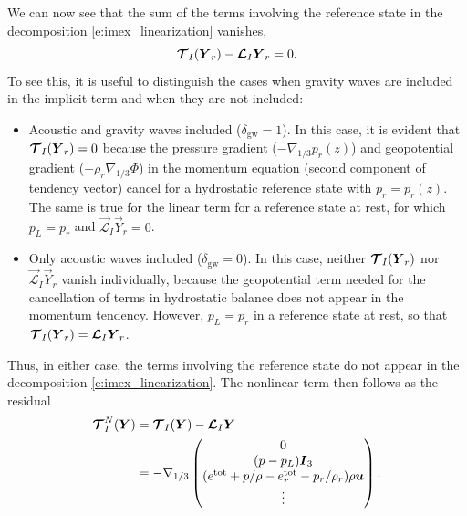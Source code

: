 \documentclass{report}
\begin{document}
{We can now see that the sum of the terms involving the reference state in the decomposition \eqref{e:imex_linearization} vanishes,
\[
\boldsymbol{{\mathcal{T}}}_I(\boldsymbol{{Y}}_r) - \boldsymbol{{\mathcal{L}}}_I \boldsymbol{{Y}}_r = 0.
\]
To see this, it is useful to distinguish the cases when gravity waves are included in the implicit term and when they are not included: 
\begin{itemize}
    \item Acoustic and gravity waves included ($\delta_{\mathrm{gw}}=1$). In this case, it is evident that $\boldsymbol{{\mathcal{T}}}_I(\boldsymbol{{Y}}_r)=0$ because the pressure gradient ($-\nabla_{1/3} p_r(z)$) and geopotential gradient ($-\rho_r\nabla_{1/3}\Phi$) in the momentum equation (second component of tendency vector) cancel for a hydrostatic reference state with $p_r = p_r(z)$. The same is true for the linear term for a reference state at rest, for which $p_L = p_r$ and $\vec{\mathcal{L}}_I \vec{Y}_r = 0$. 
    \item Only acoustic waves included ($\delta_{\mathrm{gw}}=0$). In this case, neither $\boldsymbol{{\mathcal{T}}}_I(\boldsymbol{{Y}}_r)$ nor $\vec{\mathcal{L}}_I\vec{Y}_r$ vanish individually, because the geopotential term needed for the cancellation of terms in hydrostatic balance does not appear in the momentum tendency. However, $p_L = p_r$ in a reference state at rest, so that $\boldsymbol{{\mathcal{T}}}_I(\boldsymbol{{Y}}_r) = \boldsymbol{{\mathcal{L}}}_I\boldsymbol{{Y}}_r$.
\end{itemize}
Thus, in either case, the terms involving the reference state do not appear  in the decomposition \eqref{e:imex_linearization}. The nonlinear term then follows as the residual 
\begin{equation}\label{e:nonlinear_residual}
\begin{split}
\boldsymbol{{\mathcal{T}}}^N_{I}(\boldsymbol{{Y}}) & =  \boldsymbol{{\mathcal{T}}}_I(\boldsymbol{{Y}}) - \boldsymbol{{\mathcal{L}}}_I \boldsymbol{{Y}} \\
& = 
-\nabla_{1/3} \begin{pmatrix}
0 \\
(p - p_L) \boldsymbol{{I}}_3\\
(e^{\mathrm{tot}}  + p/\rho - e^{\mathrm{tot}}_r - p_r/\rho_r) \rho \boldsymbol{{u}}\\
\vdots
\end{pmatrix}.
\end{split}
\end{equation}
}
\end{document}

